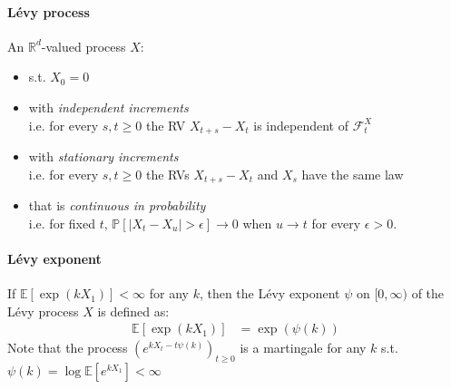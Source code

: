 \documentclass[a4paper,landscape,8pt,fleqn]{scrartcl}
\begin{document}
\begin{multicols*}{4}
\paragraph{Lévy process}
An $\mathbb{R}^d$-valued process $X$:
\begin{itemize}
\item s.t. $X_0 = 0$
\item with \textit{independent increments} \\
i.e. for every $s,t \geq 0$ the RV $X_{t+s} - X_t$ is independent of $\mathcal{F}_t^X$
\item with \textit{stationary increments} \\
i.e. for every $s,t \geq 0$ the RVs $X_{t+s} - X_t$ and $X_s$ have the same law
\item that is \textit{continuous in probability} \\
i.e. for fixed $t$, $\mathbb{P} \left[ | X_t - X_u | > \epsilon \right] \to 0$ when $u \to t$ for every $\epsilon > 0$.
\end{itemize}

\paragraph{Lévy exponent}
If $\mathbb{E} \left[ \exp(k X_1) \right] < \infty$ for any $k$, then the Lévy exponent $\psi$ on $[0,\infty)$ of the Lévy process $X$ is defined as:
\begin{align*}
\mathbb{E} \left[ \exp(k X_1) \right] &= \exp (\psi(k))
\end{align*}
Note that the process $\left( e^{k X_t - t \psi(k)} \right)_{t \geq 0}$ is a martingale for any $k$ s.t. $\psi(k) = \log \mathbb{E} \left[ e^{k X_1} \right] < \infty$


\end{multicols*}
\end{document}
